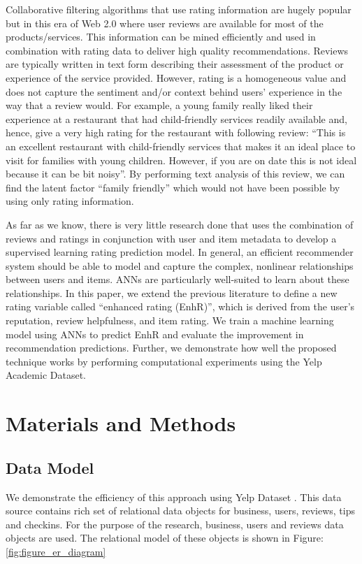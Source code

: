 \documentclass[12pt]{article}
\begin{document}
Collaborative filtering algorithms that use rating information are hugely popular but in this era of Web 2.0 where user reviews are available for most of the products/services.  This information can be mined efficiently and used in combination with rating data to deliver high quality recommendations. Reviews are typically written in text form describing their assessment of the product or experience of the service provided. However, rating is a homogeneous value and does not capture the sentiment and/or context behind users' experience in the way that a review would. For example, a young family really liked their experience at a restaurant that had child-friendly services readily available and, hence, give a very high rating for the restaurant with following review: ``This is an excellent restaurant with child-friendly services that makes it an ideal place to visit for families with young children. However, if you are on date this is not ideal because it can be bit noisy''. By performing text analysis of this review, we can find the latent factor ``family friendly'' which would not have been possible by using only rating information. 

As far as we know, there is very little research done that uses the combination of reviews and ratings in conjunction with user and item metadata to develop a supervised learning rating prediction model. In general, an efficient recommender system should be able to model and capture the complex, nonlinear relationships between users and items. ANNs are particularly well-suited to learn about these relationships. In this paper, we extend the previous literature to define a new rating variable called ``enhanced rating (EnhR)'', which is derived from the user's reputation, review helpfulness, and item rating. We train a machine learning model using ANNs to predict EnhR and evaluate the improvement in recommendation predictions. Further, we demonstrate how well the proposed technique works by performing computational experiments using the Yelp Academic Dataset.

\section{Materials and Methods}

\subsection{Data Model}
We demonstrate the efficiency of this approach using Yelp Dataset \cite{yelp-dataset}. This data source contains rich set of relational data objects for business, users, reviews, tips and checkins. For the purpose of the research, business, users and reviews data objects are used. The relational model of these objects is shown in Figure: \ref{fig:figure_er_diagram}
\end{document}
